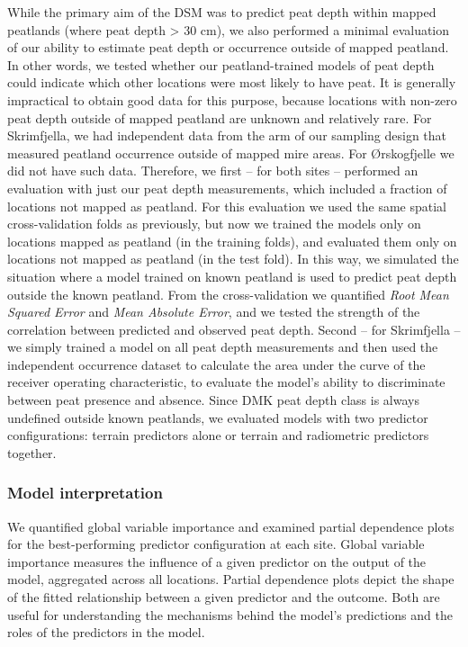 \documentclass[soil, manuscript]{copernicus}
\begin{document}
While the primary aim of the DSM was to predict peat depth within mapped peatlands (where peat depth \textgreater{} 30 cm), we also performed a minimal evaluation of our ability to estimate peat depth or occurrence outside of mapped peatland.
In other words, we tested whether our peatland-trained models of peat depth could indicate which other locations were most likely to have peat.
It is generally impractical to obtain good data for this purpose, because locations with non-zero peat depth outside of mapped peatland are unknown and relatively rare.
For Skrimfjella, we had independent data from the arm of our sampling design that measured peatland occurrence outside of mapped mire areas.
For Ørskogfjelle we did not have such data.
Therefore, we first -- for both sites -- performed an evaluation with just our peat depth measurements, which included a fraction of locations not mapped as peatland.
For this evaluation we used the same spatial cross-validation folds as previously, but now we trained the models only on locations mapped as peatland (in the training folds), and evaluated them only on locations not mapped as peatland (in the test fold).
In this way, we simulated the situation where a model trained on known peatland is used to predict peat depth outside the known peatland.
From the cross-validation we quantified \emph{Root Mean Squared Error} and \emph{Mean Absolute Error}, and we tested the strength of the correlation between predicted and observed peat depth.
Second -- for Skrimfjella -- we simply trained a model on all peat depth measurements and then used the independent occurrence dataset to calculate the area under the curve of the receiver operating characteristic, to evaluate the model's ability to discriminate between peat presence and absence.
Since DMK peat depth class is always undefined outside known peatlands, we evaluated models with two predictor configurations: terrain predictors alone or terrain and radiometric predictors together.

\subsubsection{Model interpretation}

We quantified global variable importance and examined partial dependence plots for the best-performing predictor configuration at each site.
Global variable importance measures the influence of a given predictor on the output of the model, aggregated across all locations.
Partial dependence plots depict the shape of the fitted relationship between a given predictor and the outcome.
Both are useful for understanding the mechanisms behind the model's predictions and the roles of the predictors in the model.
\end{document}
